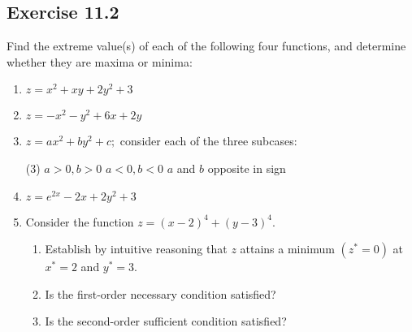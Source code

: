 \documentclass{./../../Latex/homework}
\begin{document}
\thispagestyle{plain}

\subsection*{Exercise 11.2}

Find the extreme value(s) of each of the following four functions, and determine whether they are maxima or minima:
\begin{enumerate}
\item $z=x^{2}+x y+2 y^{2}+3$
\item $z=-x^{2}-y^{2}+6 x+2 y$ 
\item $z=a x^{2}+b y^{2}+c ;$ consider each of the three subcases:
\begin{tasks}(3)
\task  $a>0, b>0$
\task $a<0, b<0$
\task $a$ and $b$ opposite in sign
\end{tasks}
\item $z=e^{2 x}-2 x+2 y^{2}+3$
\item Consider the function $z=(x-2)^{4}+(y-3)^{4}$.
\begin{enumerate}
\item Establish by intuitive reasoning that $z$ attains a minimum $\left(z^{*}=0\right)$ at $x^{*}=2$ and $y^{*}=3$.
\item Is the first-order necessary condition satisfied?
\item Is the second-order sufficient condition satisfied?
\end{enumerate}
\end{enumerate}
\end{document}
